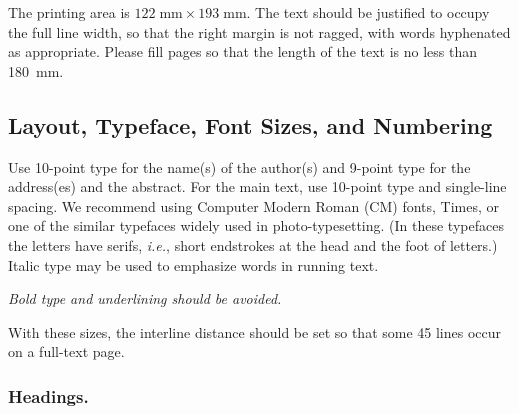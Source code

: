 \documentclass[runningheads]{llncs}
\begin{document}
The printing area is $122  \; \mbox{mm} \times 193 \;
\mbox{mm}$.
The text should be justified to occupy the full line width,
so that the right margin is not ragged, with words hyphenated as
appropriate. Please fill pages so that the length of the text
is no less than 180~mm.

\subsection{Layout, Typeface, Font Sizes, and Numbering}

Use 10-point type for the name(s) of the author(s) and 9-point type for
the address(es) and the abstract. For the main text, use 10-point
type and single-line spacing.
We recommend using Computer Modern Roman (CM) fonts, Times, or one
of the similar typefaces widely used in photo-typesetting.
(In these typefaces the letters have serifs, {\it i.e.}, short endstrokes at
the head and the foot of letters.)
Italic type may be used to emphasize words in running text. 

{\it Bold type and underlining should be avoided.}

With these sizes, the interline distance should be set so that some 45
lines occur on a full-text page.

\subsubsection{Headings.}
\end{document}
